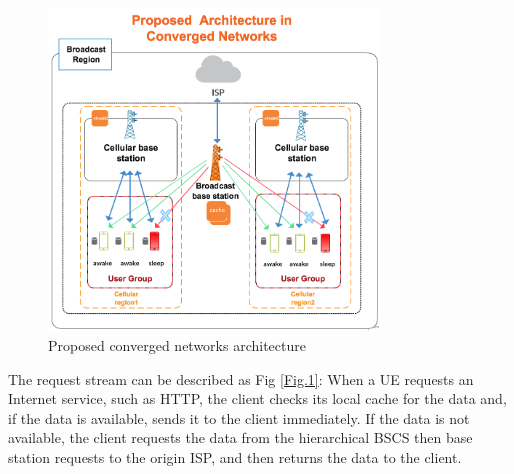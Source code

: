 \documentclass[conference]{IEEEtran}
\begin{document}
\begin{figure}[!h]
\centering
\includegraphics[width=8.8cm]{figure/converged.png}
 \caption{Proposed converged networks architecture}
\label{scenario}
\end{figure}
The request stream can be described as Fig \ref{Fig.1}: When a UE requests an Internet service, such as HTTP, the client checks its local cache for the data and, if the data is available, sends it to the client immediately. If the data is not available, the client requests the data from the hierarchical BSCS then base station requests to the origin ISP, and then returns the data to the client.
\end{document}
